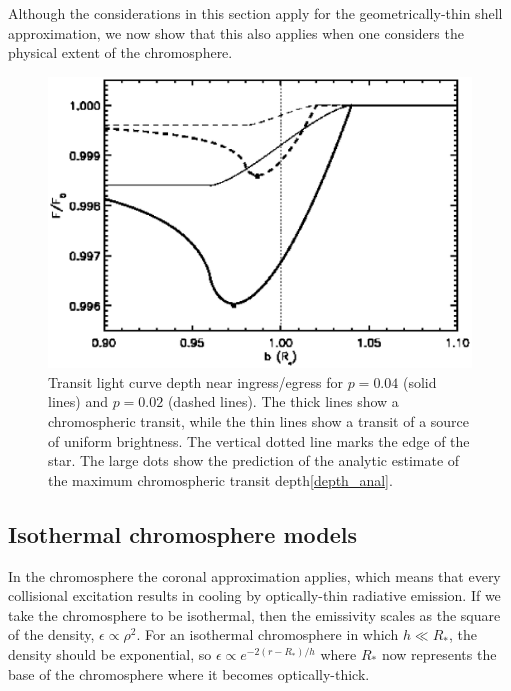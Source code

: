 \documentclass[manuscript]{aastex}
\begin{document}
Although the considerations in this section apply
for the geometrically-thin shell approximation,
we now show that this also applies when one considers
the physical extent of the chromosphere.

\begin{figure}
\includegraphics[width=\textwidth]{comp_size.eps}
\caption{Transit light curve depth near ingress/egress 
for $p=0.04$ (solid lines) and $p=0.02$ (dashed lines).
The thick lines show a chromospheric transit, while the 
thin lines show a transit of a source of uniform brightness.
The vertical dotted line marks the edge of the star.
The large dots show the prediction of the analytic
estimate of the maximum chromospheric transit depth\ref{depth_anal}.}
\label{fig02}
\end{figure}

\subsection{Isothermal chromosphere models}

In the chromosphere the coronal approximation applies,
which means that every collisional excitation results
in cooling by optically-thin radiative emission.
If we take the chromosphere to be isothermal, then
the emissivity scales as the square of the density,
$\epsilon \propto \rho^2$.  For an isothermal chromosphere
in which $h \ll R_*$, the density should be exponential,
so $\epsilon \propto e^{-2 (r-R_*)/h}$ where $R_*$
now represents the base of the chromosphere where it
becomes optically-thick.
\end{document}

